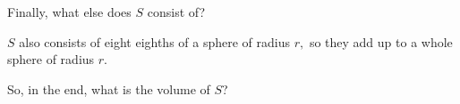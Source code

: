 Finally, what else does $S$ consist of?






$S$ also consists of eight eighths of a sphere of radius $r,$ so they add up to a whole sphere of radius $r.$

So, in the end, what is the volume of $S$?












